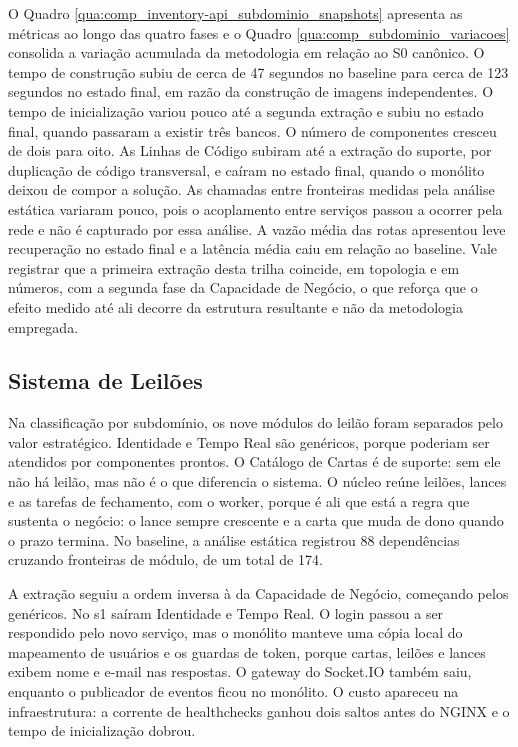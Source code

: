 O Quadro \ref{qua:comp_inventory-api_subdominio_snapshots} apresenta as métricas ao longo das quatro fases e o Quadro \ref{qua:comp_subdominio_variacoes} consolida a variação acumulada da metodologia em relação ao S0 canônico. O tempo de construção subiu de cerca de 47 segundos no baseline para cerca de 123 segundos no estado final, em razão da construção de imagens independentes. O tempo de inicialização variou pouco até a segunda extração e subiu no estado final, quando passaram a existir três bancos. O número de componentes cresceu de dois para oito. As Linhas de Código subiram até a extração do suporte, por duplicação de código transversal, e caíram no estado final, quando o monólito deixou de compor a solução. As chamadas entre fronteiras medidas pela análise estática variaram pouco, pois o acoplamento entre serviços passou a ocorrer pela rede e não é capturado por essa análise. A vazão média das rotas apresentou leve recuperação no estado final e a latência média caiu em relação ao baseline. Vale registrar que a primeira extração desta trilha coincide, em topologia e em números, com a segunda fase da Capacidade de Negócio, o que reforça que o efeito medido até ali decorre da estrutura resultante e não da metodologia empregada.





\subsection*{Sistema de Leilões}

Na classificação por subdomínio, os nove módulos do leilão foram separados pelo valor estratégico. Identidade e Tempo Real são genéricos, porque poderiam ser atendidos por componentes prontos. O Catálogo de Cartas é de suporte: sem ele não há leilão, mas não é o que diferencia o sistema. O núcleo reúne leilões, lances e as tarefas de fechamento, com o worker, porque é ali que está a regra que sustenta o negócio: o lance sempre crescente e a carta que muda de dono quando o prazo termina. No baseline, a análise estática registrou 88 dependências cruzando fronteiras de módulo, de um total de 174.

A extração seguiu a ordem inversa à da Capacidade de Negócio, começando pelos genéricos. No s1 saíram Identidade e Tempo Real. O login passou a ser respondido pelo novo serviço, mas o monólito manteve uma cópia local do mapeamento de usuários e os guardas de token, porque cartas, leilões e lances exibem nome e e-mail nas respostas. O gateway do Socket.IO também saiu, enquanto o publicador de eventos ficou no monólito. O custo apareceu na infraestrutura: a corrente de healthchecks ganhou dois saltos antes do NGINX e o tempo de inicialização dobrou.

